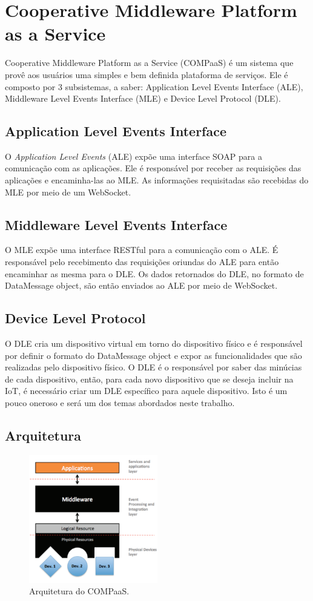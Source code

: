 \section{Cooperative Middleware Platform as a Service}
\label{sec:COMPaaS}
Cooperative Middleware Platform as a Service (COMPaaS) é um sistema que provê aos usuários uma simples e bem
definida plataforma de serviços. Ele é composto por 3 subsistemas, a saber:  Application Level Events
Interface (ALE), Middleware Level Events Interface (MLE) e Device Level Protocol (DLE).

\subsection{Application Level Events Interface}
O \textit{Application Level Events} (ALE) expõe uma interface SOAP para a comunicação com as aplicações.
Ele é responsável por receber as requisições das aplicações e encaminha-las ao MLE. As informações
requisitadas são recebidas do MLE por meio de um WebSocket.

\subsection{Middleware Level Events Interface}
O MLE expõe uma interface RESTful para a comunicação com o ALE. É responsável pelo recebimento das requisições
oriundas do ALE para então encaminhar as mesma para o DLE. Os dados retornados do DLE, no formato de DataMessage
object, são então enviados ao ALE por meio de WebSocket.

\subsection{Device Level Protocol}
O DLE cria um dispositivo virtual em torno do dispositivo físico e é responsável por definir o formato do DataMessage
object e expor as funcionalidades que são realizadas pelo dispositivo físico. O DLE é o responsável por saber das
minúcias de cada dispositivo, então, para cada novo dispositivo que se deseja incluir na IoT, é necessário criar
um DLE específico para aquele dispositivo. Isto é um pouco oneroso e será um dos temas abordados neste trabalho.

\subsection{Arquitetura}
\begin{figure}[H]
	\centering
		\includegraphics[width=0.5\textwidth]{fig/compaas_arch.png}
	\caption{Arquitetura do COMPaaS.}
\end{figure}

